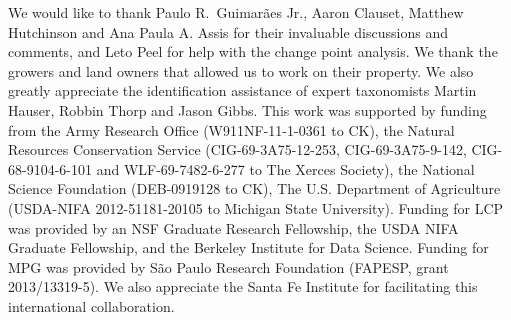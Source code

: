 \documentclass[12pt]{article}
\begin{document}
We would like to thank Paulo R.~Guimar{\~a}es Jr., Aaron Clauset,
Matthew Hutchinson and Ana Paula A. Assis for their invaluable
discussions and comments, and Leto Peel for help with the change point
analysis.  We thank the growers and land owners that allowed us to
work on their property. We also greatly appreciate the identification
assistance of expert taxonomists Martin Hauser, Robbin Thorp and Jason
Gibbs.  This work was supported by funding from the Army Research
Office (W911NF-11-1-0361 to CK), the Natural Resources Conservation
Service (CIG-69-3A75-12-253, CIG-69-3A75-9-142, CIG-68-9104-6-101 and
WLF-69-7482-6-277 to The Xerces Society), the National Science
Foundation (DEB-0919128 to CK), The U.S.  Department of Agriculture
(USDA-NIFA 2012-51181-20105 to Michigan State University).  Funding
for LCP was provided by an NSF Graduate Research Fellowship, the USDA
NIFA Graduate Fellowship, and the Berkeley Institute for Data
Science. Funding for MPG was provided by S{\~a}o Paulo Research
Foundation (FAPESP, grant 2013/13319-5). We also appreciate the Santa
Fe Institute for facilitating this international collaboration.




\end{document}
